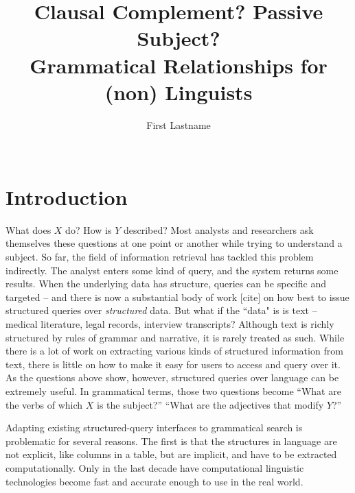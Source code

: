 \documentclass{sigchi}
\begin{document}
\title{Clausal Complement? Passive Subject?\\Grammatical Relationships for (non) Linguists}

\author{%
\alignauthor First Lastname\\
\\
}

\maketitle

\begin{abstract}

\end{abstract}

\section{Introduction}

What does $X$ do? How is $Y$ described? Most analysts and researchers ask themselves these questions at one point or another while trying to understand a subject.  So far, the field of information retrieval has tackled this problem indirectly. The analyst enters some kind of query, and the system returns some results. When the underlying data has structure, queries can be specific and targeted -- and there is now a substantial body of work [cite] on how best to issue structured queries over \emph{structured} data. But what if the ``data" is is text -- medical literature, legal records, interview transcripts? Although text is richly structured by rules of  grammar and narrative, it is rarely treated as such. While there is a lot of work on extracting various kinds of structured information from text, there is little on how to make it easy for users to access and query over it.  As the questions above show, however, structured queries over language can be extremely useful. In grammatical terms, those two questions become ``What are the verbs of which $X$ is the subject?'' ``What are the adjectives that modify $Y$?''  

Adapting existing structured-query interfaces to grammatical search is problematic for several reasons. The first is that the structures in language are not explicit, like columns in a table, but are implicit, and have to be extracted computationally. Only in the last decade have computational linguistic technologies become fast and accurate enough to use in the real world. 
\end{document}
